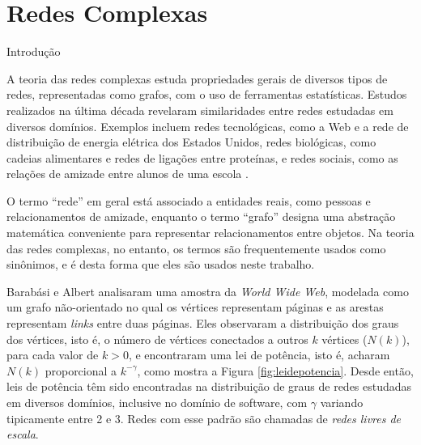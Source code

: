 
\chapter{Redes Complexas} \label{cap:redes} 

\begin{section}{Introdução} \label{sec:redes-complexas} %


A teoria das redes complexas estuda propriedades gerais de diversos tipos de redes, representadas como grafos, com o uso de ferramentas estatísticas. Estudos realizados na última década revelaram similaridades entre redes estudadas em diversos domínios. Exemplos incluem redes tecnológicas, como a Web e a rede de distribuição de energia elétrica dos Estados Unidos, redes biológicas, como cadeias alimentares e redes de ligações entre proteínas, e redes sociais, como as relações de amizade entre alunos de uma escola \cite{Newman2003}.

O termo ``rede'' em geral está associado a entidades reais, como pessoas e relacionamentos de amizade, enquanto o termo ``grafo'' designa uma abstração matemática conveniente para representar relacionamentos entre objetos. Na teoria das redes complexas, no entanto, os termos são frequentemente usados como sinônimos, e é desta forma que eles são usados neste trabalho.

Barabási e Albert \cite{Barabasi1999} analisaram uma amostra da \emph{World Wide Web}, modelada como um grafo não-orientado no qual os vértices representam páginas e as arestas representam \emph{links} entre duas páginas. Eles observaram a distribuição dos graus dos vértices, isto é, o número de vértices conectados a outros $k$ vértices ($N(k)$), para cada valor de $k > 0$, e encontraram uma lei de potência, isto é, acharam $N(k)$ proporcional a $k^{-\gamma}$, como mostra a Figura \ref{fig:leidepotencia}. Desde então, leis de potência têm sido encontradas na distribuição de graus de redes estudadas em diversos domínios, inclusive no domínio de software, com $\gamma$ variando tipicamente entre 2 e 3. Redes com esse padrão são chamadas de \emph{redes livres de escala}.



\end{section}
